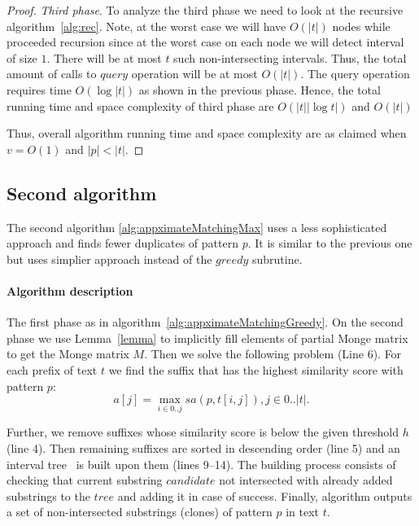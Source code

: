\begin{proof}
\emph{Third phase}.
To analyze the third phase we need to look at the recursive algorithm~\ref{alg:rec}.
Note, at the worst case we will have $O(|t|)$ nodes while proceeded recursion since at the worst case on each node we will detect interval of size $1$.
There will be at most $t$ such non-intersecting intervals.
Thus, the total amount of calls to $query$ operation will be at most $O(|t|)$.
The query operation requires time $O(\log |t|)$ as shown in the previous phase.
Hence, the total running time and space complexity of third phase are $O(|t| |\log t|)$ and $O(|t|)$  

Thus, overall algorithm running time and space complexity are as claimed when $v=O(1)$ and $|p|<|t|$.
\end{proof}

\subsection{Second algorithm}
The second algorithm \ref{alg:appximateMatchingMax} uses a less sophisticated approach and finds fewer duplicates of pattern $p$.
It is similar to the previous one but uses simplier approach instead of the $greedy$ subrutine.

\paragraph{Algorithm description}

The first phase as in algorithm~\ref{alg:appximateMatchingGreedy}.
On the second phase we use Lemma~\ref{lemma} to implicitly fill elements of partial Monge matrix to get the Monge matrix $M$.
Then we solve the following problem (Line 6).
For each prefix of text $t$ we find the suffix that has the highest similarity score with pattern $p$:
$$ a[j] = \max _{i \in 0 ..j} sa(p,t[i,j]), j \in 0..|t|.$$

Further, we remove suffixes whose similarity score is below the given threshold $h$ (line 4).
Then remaining suffixes are sorted in descending order (line 5) and an interval tree~\cite{pal2009interval} is built upon them (lines 9--14).
The building process consists of checking that current substring $candidate$ not intersected with already added substrings to the $tree$ and adding it in case of success.
Finally, algorithm outputs a set of non-intersected substrings (clones) of pattern $p$ in text $t$.

